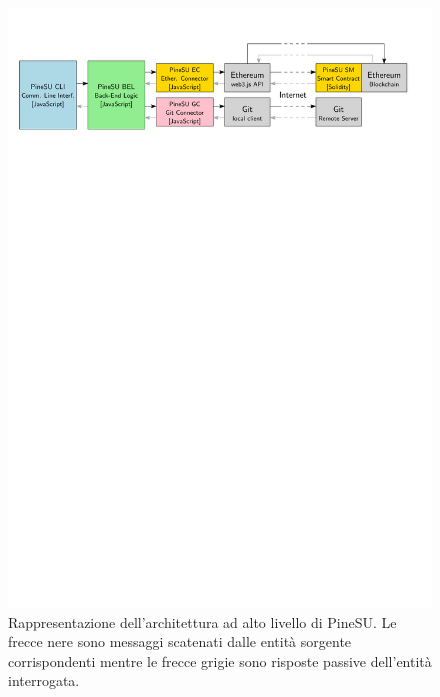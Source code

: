 \begin{figure}[H]
    \centering
    \includegraphics[width=\textwidth]{Figures/PineSU-architecture}
    \caption{\small{
    Rappresentazione dell'architettura ad alto livello di PineSU. 
    Le frecce nere sono messaggi scatenati dalle entità sorgente corrispondenti
    mentre le frecce grigie sono risposte passive dell'entità interrogata.
    } %
    } %
    \label{fi:arch}
\end{figure}

